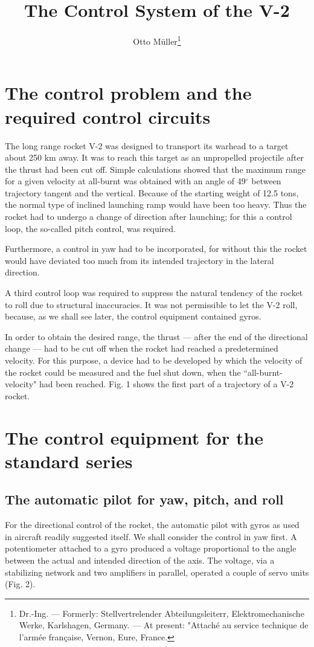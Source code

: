 \documentclass[11pt, a4paper]{article}
\title{The Control System of the V-2}
\author{Otto Müller\footnote{Dr.-Ing. — Formerly: Stellvertrelender Abteilungsleiterr, Elektromechanische Werke, Karlshagen, Germany. — At present: "Attaché au service technique de l'armée française, Vernon, Eure, France.}}
\date{}
\begin{document}
\maketitle

\section{The control problem and the required control circuits}

The long range rocket V-2 was designed to transport its warhead to a target about 250 km away. It was to reach this target as an unpropelled projectile after the thrust had been cut off. Simple calculations showed that the maximum range for a given velocity at all-burnt was obtained with an angle of 49$^\circ$ between trajectory tangent and the vertical. Because of the starting weight of 12.5 tons, the normal type of inclined launching ramp would have been too heavy. Thus the rocket had to undergo a change of direction after launching; for this a control loop, the so-called pitch control, was required.

Furthermore, a control in yaw had to be incorporated, for without this the rocket would have deviated too much from its intended trajectory in the lateral direction.

A third control loop was required to suppress the natural tendency of the rocket to roll due to structural inaccuracies. It was not permissible to let the V-2 roll, because, as we shall see later, the control equipment contained gyros.

In order to obtain the desired range, the thrust — after the end of the directional change — had to be cut off when the rocket had reached a predetermined velocity. For this purpose, a device had to be developed by which the velocity of the rocket could be measured and the fuel shut down, when the ``all-burnt-velocity" had been reached. Fig. 1 shows the first part of a trajectory of a V-2 rocket.

\section{The control equipment for the standard series}

\subsection{The automatic pilot for yaw, pitch, and roll}

For the directional control of the rocket, the automatic pilot with gyros as used in aircraft readily suggested itself. We shall consider the control in yaw first. A potentiometer attached to a gyro produced a voltage proportional to the angle between the actual and intended direction of the axis. The voltage, via a stabilizing network and two amplifiers in parallel, operated a couple of servo units (Fig. 2).
\end{document}
